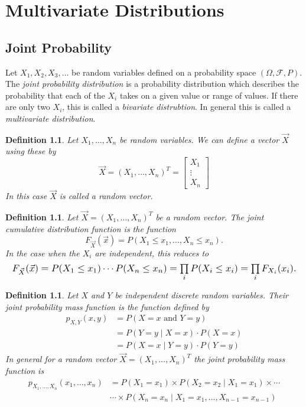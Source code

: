 \documentclass[1pt]{report}
\newtheorem{defn}[thm]{Definition}
\newcommand{\<}{\langle}
\renewcommand{\>}{\rangle}
\newcommand{\FF}{\mathcal{F}}
\begin{document}
\chapter{Multivariate Distributions}
\section{Joint Probability}
Let $X_1, X_2, X_3, \dots$ be random variables defined on a probability space $(\Omega, \FF, P)$. The \emph{joint probability distribution} is a probability distribution which describes the probability that each of the $X_i$ takes on a given value or range of values. If there are only two $X_i$, this is called a \emph{bivariate distrubtion}. In general this is called a \emph{multivariate distribution}.
\begin{defn}\label{def:randomvector}
Let $X_1, \dots , X_n$ be random variables. We can define a vector $\vec{X}$ using these by
$$\vec X = (X_1, \dots, X_n)^T = \begin{bmatrix} X_1 \\ \vdots \\ X_n\end{bmatrix}$$
In this case $\vec X$ is called a \emph{random vector}.
\end{defn}
\begin{defn}\label{def:jointcumulative}
Let $\vec X = (X_1, \dots, X_n)^T$ be a random vector. The joint cumulative distribution function is the function
$$F_{\vec{X}}(\vec{x}) = P(X_1 \leq x_1 , \dots, X_n \leq x_n).$$
In the case when the $X_i$ are independent, this reduces to
$$\resizebox{\textwidth}{!}{$F_{\vec{X}}(\vec{x}) = P(X_1\leq x_1)\cdots P(X_n \leq x_n) = \prod\limits_i P(X_i \leq x_i) = \prod\limits_i F_{X_i}(x_i).$}$$
\end{defn}
\begin{defn}\label{def:jointpmf}
Let $X$ and $Y$ be independent discrete random variables. Their \emph{joint probability mass function} is the function defined by
\begin{align*}
p_{X,Y}(x,y) &= P(X=x\text{ and }Y=y)\\
&=P(Y=y \mid X=x) \cdot P(X=x)\\
&=P(X=x \mid Y=y) \cdot P(Y=y)
\end{align*}
In general for a random vector $\vec X = (X_1,\dots, X_n)^T$ the joint probability mass function is
\begin{align*}
p_{X_1,\dots,X_n}(x_1,\dots, x_n) &= P(X_1 = x_1)\times P(X_2=x_2 \mid X_1 = x_1) \times \cdots \\
& \cdots\times P(X_n = x_n \mid X_1 = x_1, \dots , X_{n-1}=x_{n-1})
\end{align*}
\end{defn}
\end{document}
